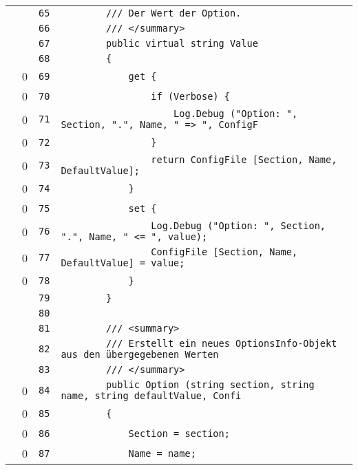 \documentclass[a4paper,10pt]{article}
\begin{document}
\begin{longtable}[l]{lrrl}
\cellcolor{gray} &  & \verb~65~ & \verb~        /// Der Wert der Option.~\\
\cellcolor{gray} &  & \verb~66~ & \verb~        /// </summary>~\\
\cellcolor{gray} &  & \verb~67~ & \verb~        public virtual string Value~\\
\cellcolor{gray} &  & \verb~68~ & \verb~        {~\\
\cellcolor{red} & 0 & \verb~69~ & \verb~            get {~\\
\cellcolor{red} & 0 & \verb~70~ & \verb~                if (Verbose) {~\\
\cellcolor{red} & 0 & \verb~71~ & \verb~                    Log.Debug ("Option: ", Section, ".", Name, " => ", ConfigF~\\
\cellcolor{red} & 0 & \verb~72~ & \verb~                }~\\
\cellcolor{red} & 0 & \verb~73~ & \verb~                return ConfigFile [Section, Name, DefaultValue];~\\
\cellcolor{red} & 0 & \verb~74~ & \verb~            }~\\
\cellcolor{red} & 0 & \verb~75~ & \verb~            set {~\\
\cellcolor{red} & 0 & \verb~76~ & \verb~                Log.Debug ("Option: ", Section, ".", Name, " <= ", value);~\\
\cellcolor{red} & 0 & \verb~77~ & \verb~                ConfigFile [Section, Name, DefaultValue] = value;~\\
\cellcolor{red} & 0 & \verb~78~ & \verb~            }~\\
\cellcolor{gray} &  & \verb~79~ & \verb~        }~\\
\cellcolor{gray} &  & \verb~80~ & \verb~~\\
\cellcolor{gray} &  & \verb~81~ & \verb~        /// <summary>~\\
\cellcolor{gray} &  & \verb~82~ & \verb~        /// Erstellt ein neues OptionsInfo-Objekt aus den übergegebenen Werten~\\
\cellcolor{gray} &  & \verb~83~ & \verb~        /// </summary>~\\
\cellcolor{red} & 0 & \verb~84~ & \verb~        public Option (string section, string name, string defaultValue, Confi~\\
\cellcolor{red} & 0 & \verb~85~ & \verb~        {~\\
\cellcolor{red} & 0 & \verb~86~ & \verb~            Section = section;~\\
\cellcolor{red} & 0 & \verb~87~ & \verb~            Name = name;~\\

\end{longtable}
\end{document}
